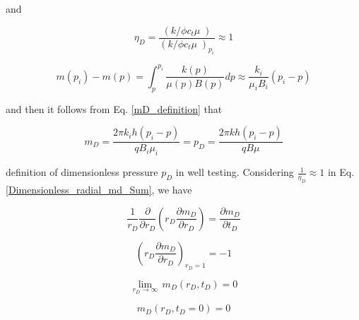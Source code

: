 \documentclass{llncs}
\numberwithin{equation}{section}
\numberwithin{figure}{section}
\numberwithin{table}{section}
\begin{document}
    and

    \begin{equation}
        {{\eta }_{D}}=\frac{\left( {k}/{\phi {{c}_{t}}\mu }\; \right)}{{{\left( {k}/{\phi {{c}_{t}}\mu }\; \right)}_{{{p}_{i}}}}}\approx 1
        \label{assumption_1}
    \end{equation}

    \begin{equation}
        m\left( {{p}_{i}} \right)-m\left( p \right)=\int_{p}^{{{p}_{i}}}{\frac{k\left( p \right)}{\mu \left( p \right)B\left( p \right)}dp\approx \frac{{{k}_{i}}}{{{\mu }_{i}}{{B}_{i}}}}\left( {{p}_{i}}-p \right)
        \label{assumption_2}
    \end{equation}

    and then it follows from Eq. \ref{mD_definition} that

    \begin{equation}
        {{m}_{D}}=\frac{2\pi {{k}_{i}} h\left( {{p}_{i}}-p \right)}{q{{B}_{i}}{{\mu }_{i}}}={{p}_{D}}=\frac{2\pi k h\left( {{p}_{i}}-p \right)}{qB\mu }
        \label{mD_to_pD}
    \end{equation}

     definition of dimensionless pressure $p_{D}$ in well testing.
    Considering $\frac{1}{{{\eta }_{D}}}\approx 1$ in Eq. \ref{Dimensionless_radial_md_Sum}, we have

    \begin{equation}
        \frac{1}{{{r}_{D}}}\frac{\partial }{\partial {{r}_{D}}}\left( {{r}_{D}}\frac{\partial {{m}_{D}}}{\partial {{r}_{D}}} \right)=\frac{\partial {{m}_{D}}}{\partial {{t}_{D}}}
        \label{Dimensionless_radial_md_Sum_lin}
    \end{equation}

    \begin{equation}
        {{\left( {{r}_{D}}\frac{\partial {{m}_{D}}}{\partial {{r}_{D}}} \right)}_{{{r}_{D}}=1}}=-1
        \label{Boundary_1_sum_lin}
    \end{equation}

    \begin{equation}
        \underset{{{r}_{D}}\to \infty }{\mathop{\lim }}\,{{m}_{D}}\left( {{r}_{D}},{{t}_{D}} \right)=0
        \label{Boundary_2_sum_lin}
    \end{equation}

    \begin{equation}
        {{m}_{D}}\left( {{r}_{D}},{{t}_{D}}=0 \right)=0
        \label{Initial_con_sum_lin}
    \end{equation}
\end{document}
